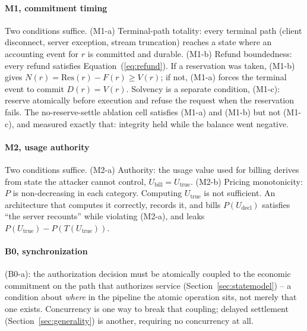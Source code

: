 \documentclass[final,5p,times,twocolumn,number]{elsarticle}
\begin{document}
\paragraph{M1, commitment timing}
Two conditions suffice. (M1-a) Terminal-path totality: every terminal path (client
disconnect, server exception, stream truncation) reaches a state where an accounting
event for $r$ is committed and durable. (M1-b) Refund boundedness: every refund satisfies
Equation~(\ref{eq:refund}). If a reservation was taken, (M1-b) gives $N(r) =
\mathrm{Res}(r) - F(r) \ge V(r)$; if not, (M1-a) forces the terminal event to commit
$D(r) = V(r)$. Solvency is a separate condition, (M1-c): reserve atomically before
execution and refuse the request when the reservation fails. The no-reserve-settle
ablation cell satisfies (M1-a) and (M1-b) but not (M1-c), and measured exactly that:
integrity held while the balance went negative.

\paragraph{M2, usage authority}
Two conditions suffice. (M2-a) Authority: the usage value used for billing derives from
state the attacker cannot control, $U_{\mathrm{bill}} = U_{\mathrm{true}}$. (M2-b)
Pricing monotonicity: $P$ is non-decreasing in each category. Computing $U_{\mathrm{true}}$
is not sufficient. An architecture that computes it correctly, records it, and bills
$P(U_{\mathrm{decl}})$ satisfies ``the server recounts'' while violating (M2-a), and
leaks $P(U_{\mathrm{true}}) - P(T(U_{\mathrm{true}}))$.

\paragraph{B0, synchronization}
(B0-a): the authorization decision must be atomically coupled to the economic commitment
on the path that authorizes service (Section~\ref{sec:statemodel}) -- a condition about
\emph{where} in the pipeline the atomic operation sits, not merely that one exists.
Concurrency is one way to break that coupling; delayed settlement
(Section~\ref{sec:generality}) is another, requiring no concurrency at all.
\end{document}
